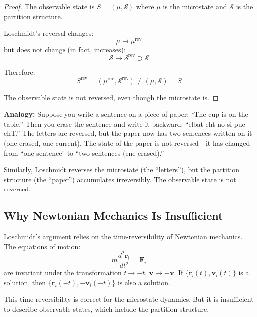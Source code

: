 \documentclass[twocolumn,10pt]{article}
\theoremstyle{definition}
\theoremstyle{remark}
\begin{document}
\begin{proof}
The observable state is $S = (\mu, \mathcal{S})$ where $\mu$ is the microstate and $\mathcal{S}$ is the partition structure.

Loschmidt's reversal changes:
\begin{equation}
\mu \to \mu^{\text{rev}}
\end{equation}
but does not change (in fact, increases):
\begin{equation}
\mathcal{S} \to \mathcal{S}^{\text{rev}} \supset \mathcal{S}
\end{equation}

Therefore:
\begin{equation}
S^{\text{rev}} = (\mu^{\text{rev}}, \mathcal{S}^{\text{rev}}) \neq (\mu, \mathcal{S}) = S
\end{equation}

The observable state is not reversed, even though the microstate is.
\end{proof}

\noindent\textbf{Analogy:} Suppose you write a sentence on a piece of paper: ``The cup is on the table.'' Then you erase the sentence and write it backward: ``elbat eht no si puc ehT.'' The letters are reversed, but the paper now has two sentences written on it (one erased, one current). The state of the paper is not reversed—it has changed from ``one sentence'' to ``two sentences (one erased).''

\vspace{0.2cm}
\noindent Similarly, Loschmidt reverses the microstate (the ``letters''), but the partition structure (the ``paper'') accumulates irreversibly. The observable state is not reversed.

\subsection{Why Newtonian Mechanics Is Insufficient}

Loschmidt's argument relies on the time-reversibility of Newtonian mechanics. The equations of motion:
\begin{equation}
m \frac{d^2 \mathbf{r}_i}{dt^2} = \mathbf{F}_i
\end{equation}
are invariant under the transformation $t \to -t$, $\mathbf{v} \to -\mathbf{v}$. If $\{\mathbf{r}_i(t), \mathbf{v}_i(t)\}$ is a solution, then $\{\mathbf{r}_i(-t), -\mathbf{v}_i(-t)\}$ is also a solution.

\vspace{0.2cm}
\noindent This time-reversibility is correct for the microstate dynamics. But it is insufficient to describe observable states, which include the partition structure.
\end{document}
